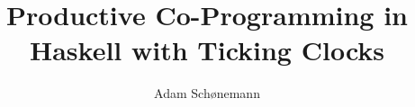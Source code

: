\documentclass[sigplan,9pt,review]{acmart}\settopmatter{printfolios=true,printccs=false,printacmref=false}
\begin{document}
\begin{comment}
A major problem is how to present tick-application and normal application properly.
In the source code, they share the same abstract syntax, but we distinguish by wrapping
tick-variables and tick-constants in brackets.
So e1 e2 is `App e1 e2` and e1 [e2] is `App e1 (TickVar e2)`.
But the presentation only has syntax e1 e2 and e1 [e2], so (TickVar e2) so not exist as
syntax. Because of that, we cannot use the presentation of the algorithmic inference rules
in its current form, as it refers to non-existant syntax, since [x] and [♢] cannot stand
alone. So either, change the presentation-syntax to conform with the implementation, or
you will have to come up with new rule exactly like application-synthesis, but for ticks.
\end{comment}
\sloppy

\title[Productive Co-Programming in Haskell]{Productive Co-Programming in Haskell with Ticking Clocks}         %



\author{Adam Schønemann}
\end{document}
